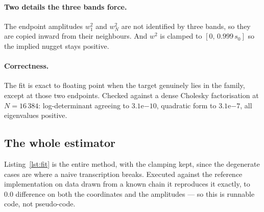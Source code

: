 \documentclass[11pt,a4paper]{article}
\begin{document}
\paragraph{Two details the three bands force.} The endpoint amplitudes $w^2_1$ and $w^2_N$ are
not identified by three bands, so they are copied inward from their neighbours. And $w^2$ is
clamped to $[0,\, 0.999\, s_0]$ so the implied nugget stays positive.

\paragraph{Correctness.} The fit is exact to floating point when the target genuinely lies in
the family, except at those two endpoints. Checked against a dense Cholesky factorisation at
$N = 16\,384$: log-determinant agreeing to $3.1\mathrm{e}{-10}$, quadratic form to
$3.1\mathrm{e}{-7}$, all eigenvalues positive.

\subsection{The whole estimator}

Listing~\ref{lst:fit} is the entire method, with the clamping kept, since the degenerate cases
are where a naive transcription breaks. Executed against the reference implementation on data
drawn from a known chain it reproduces it exactly, to $0.0$ difference on both the coordinates
and the amplitudes --- so this is runnable code, not pseudo-code.
\end{document}
